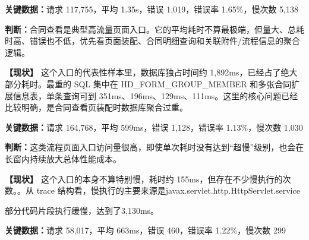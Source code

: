 \noindent\textbf{关键数据：}请求 117,755，平均 1.35s，错误 1,019，错误率 1.65\%，慢次数 5,138\par

\noindent\textbf{判断：}合同查看是典型高流量页面入口。它的平均耗时不算最极端，但量大、总耗时高、错误也不低，优先看页面装配、合同明细查询和关联附件/流程信息的聚合逻辑。\par

\vspace{0.25em}

\noindent\textbf{【现状】} 这个入口的代表性样本里，数据库独占时间约 1,892ms，已经占了绝大部分耗时。最重的 SQL 集中在 HD\_FORM\_GROUP\_MEMBER 和多张合同扩展信息表，单条查询可到 351ms、196ms、129ms、111ms。这里的核心问题已经比较明确，是合同查看页装配时数据库聚合过重。\par

\vspace{0.35em}\par

\noindent\textbf{关键数据：}请求 164,768，平均 599ms，错误 1,128，错误率 1.13\%，慢次数 1,030\par

\noindent\textbf{判断：}这类流程页面入口访问量很高，即使单次耗时没有达到“超慢”级别，也会在长窗内持续放大总体性能成本。\par

\vspace{0.25em}

\noindent\textbf{【现状】} 这个入口的本身不算特别慢，耗时约 155ms，但存在不少慢执行的次数。。从 trace 结构看，慢执行的主要来源是javax.servlet.http.HttpServlet.service\par

部分代码片段执行缓慢，达到了3,130ms。\par

\vspace{0.35em}\par

\noindent\textbf{关键数据：}请求 58,017，平均 663ms，错误 460，错误率 1.22\%，慢次数 299\par

